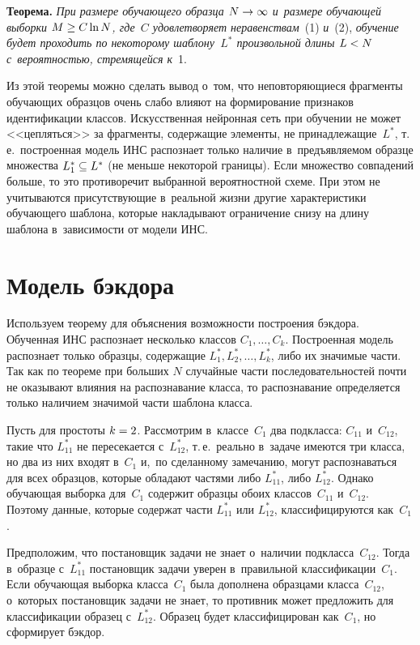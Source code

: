\begin{multicols}{2}
\pagebreak
  
  \noindent
  \textbf{Теорема.} \textit{При размере обучающего образца $N\hm\to \infty$ 
и~размере обуча\-ющей выборки $M\hm\geq C\ln N$, где~$C$ удовле\-тво\-ря\-ет 
неравенствам}~(1) \textit{и}~(2), \textit{обучение будет проходить по некоторому 
шаблону~$L^*$ произвольной длины $L\hm< N$ с~вероятностью, стремящейся 
к}~1.
  
  \smallskip
  
  Из этой теоремы можно сделать вывод о~том, что неповторяющиеся фрагменты 
обуча\-ющих образцов очень слабо влияют на формирование признаков 
идентификации классов. Искусственная нейронная сеть при обуче\-нии не может <<цепляться>> за 
фрагменты, содержащие элементы, не принадлежащие~$L^*$, т.\,е.\
  построенная модель ИНС распознает только наличие в~предъявляемом 
образце множества $L_1^*\hm\subseteq L^*$ (не меньше некоторой границы). 
Если множество совпадений больше, то это противоречит выбранной 
вероятностной схеме.
  При этом не учитываются присутствующие в~реальной жизни другие 
характеристики обуча\-юще\-го шаблона, которые накладывают ограничение снизу 
на длину шаблона в~за\-ви\-си\-мости от модели ИНС.
  
  \section{Модель бэкдора}
  
  Используем теорему для объяснения возможности построения бэкдора. 
Обученная ИНС распознает несколько классов $C_1, \ldots , C_k$. Построенная 
модель распознает только образцы, \mbox{содержащие} $L_1^*, L_2^*, \ldots , L_k^*$, 
либо их значимые части. Так как по теореме при больших $N$ случайные части 
последовательностей почти не оказывают влияния на распознавание класса, то 
распознавание определяется только наличием значимой части шаблона класса.
  
  Пусть для простоты $k\hm=2$. Рассмотрим в~классе~$C_1$ два подкласса: 
$C_{11}$ и~$C_{12}$, такие что $L_{11}^*$ не пересекается с~$L_{12}^*$, т.\,е.\
 реально в~задаче имеются три класса, но два из них входят в~$C_1$ и,~по 
сделанному замечанию, могут распознаваться для всех образцов, которые 
обладают частями либо $L_{11}^*$, либо $L_{12}^*$. Однако обучающая 
выборка для~$C_1$ содержит образцы обоих классов~$C_{11}$ и~$C_{12}$. 
Поэтому данные, которые содержат час\-ти $L_{11}^*$ или $L_{12}^*$, 
классифицируются как~$C_1$.
  
  Предположим, что постановщик задачи не знает о~наличии 
подкласса~$C_{12}$. Тогда в~образце с~$L_{11}^*$ постановщик задачи уверен 
в~правильной классификации~$C_1$. Если обуча\-ющая выборка класса~$C_1$ 
была дополнена образцами класса~$C_{12}$, о~которых постановщик задачи не 
знает, то противник может предложить для классификации образец с~$L_{12}^*$. 
Образец будет классифицирован как~$C_1$, но сформирует бэкдор.
  

\end{multicols}
